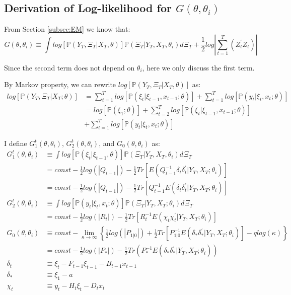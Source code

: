\documentclass[10pt]{article}
\numberwithin{equation}{section}
\begin{document}
\subsection{Derivation of Log-likelihood for $G(\theta,\theta_i)$} \label{ap:log}
From Section \ref{subsec:EM} we know that:
\[
    G(\theta,\theta_i) \equiv \int log[\mathbb{P}(Y_T,\Xi_T|X_T,\theta)]\mathbb{P}(\Xi_T|Y_T,X_T,\theta_i)d\Xi_T + \frac{1}{2}log\left|\sum_{t=1}^{T}(Z_t^{'}Z_t)\right| 
\]

Since the second term does not depend on $\theta_i$, here we only discuss the first term. 

By Markov property, we can rewrite $log[\mathbb{P}(Y_T,\Xi_T|X_T,\theta)]$ as:
\begin{align}
    log[\mathbb{P}(Y_T,\Xi_T|X_T;\theta)] &= \sum_{t=1}^{T}log[\mathbb{P}(\xi_t|\xi_{t-1},x_{t-1};\theta)] 
    + \sum_{t=1}^{T}log[\mathbb{P}(y_t|\xi_t,x_t;\theta)] \nonumber \\
    &= log[\mathbb{P}(\xi_1;\theta)] + \sum_{t=2}^{T}log[\mathbb{P}(\xi_t|\xi_{t-1},x_{t-1};\theta)] \nonumber \\ 
    &+ \sum_{t=1}^{T}log[\mathbb{P}(y_t|\xi_t,x_t;\theta)]\label{eq:log}
\end{align}

I define $G_1^{t}(\theta,\theta_i)$, $G_2^{t}(\theta,\theta_i)$, and $G_0(\theta,\theta_i)$ as:
\begin{align}
    G_1^{t}(\theta,\theta_{i}) &\equiv \int log[\mathbb{P}(\xi_t|\xi_{t-1},\theta)]\mathbb{P}(\Xi_T|Y_T,X_T,\theta_{i})d\Xi_T \nonumber \\
    &= const -\frac{1}{2}log(|Q_{t-1}|)-\frac{1}{2}Tr[E(Q_{t-1}^{-1}\delta_t\delta_t^{'}|Y_T,X_T;\theta_{i})] \nonumber \\
    &= const - \frac{1}{2}log(|Q_{t-1}|) - \frac{1}{2}Tr[Q_{t-1}^{-1}E(\delta_t\delta_t^{'}|Y_T,X_T;\theta_{i})] \label{eq:log1_trace} \\
    G_2^t(\theta,\theta_{i}) &\equiv \int log[\mathbb{P}(y_t|\xi_{t},x_t; \theta)]\mathbb{P}(\Xi_T|Y_T,X_T;\theta_{i})d\Xi_T \nonumber \\
    &= const - \frac{1}{2}log(|R_t|)-\frac{1}{2}Tr[R_t^{-1}E(\chi_t\chi_t^{'}|Y_T,X_T;\theta_{i})] \label{eq:log2_trace} \\
    G_0(\theta,\theta_{i}) &\equiv const - \lim_{\kappa\rightarrow\infty}\left\{\frac{1}{2}log(|P_{1|0}|) + \frac{1}{2}Tr[P_{1|0}^{-1}E(\delta_*\delta_*^{'}|Y_T, X_T; \theta_{i})] - qlog(\kappa)\right\} \nonumber \\
    &=const - \frac{1}{2}log(|P_*|)-\frac{1}{2}Tr(P_*^{-1}E(\delta_*\delta_*^{'}|Y_T, X_T; \theta_{i})) \\
    \delta_t &\equiv \xi_t - F_{t-1}\xi_{t-1} - B_{t-1}x_{t-1} \nonumber \\
    \delta_* &\equiv \xi_1 - a \nonumber \\
    \chi_t &\equiv y_t - H_t\xi_t - D_tx_t \nonumber
\end{align}
\end{document}
